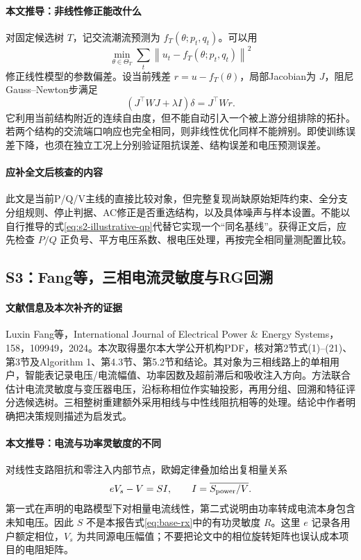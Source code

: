 \documentclass[UTF8,11pt,fontset=fandol]{ctexart}
\newcommand{\norm}[1]{\left\lVert#1\right\rVert}
\theoremstyle{remark}
\numberwithin{equation}{section}
\begin{document}
\paragraph{本文推导：非线性修正能改什么}
对固定候选树 $T$，记交流潮流预测为 $f_T(\theta;p_t,q_t)$。可以用
\begin{equation}
 \min_{\theta\in\Theta_T}\sum_t\norm{u_t-f_T(\theta;p_t,q_t)}^2
\end{equation}
修正线性模型的参数偏差。设当前残差 $r=u-f_T(\theta)$，局部Jacobian为 $J$，阻尼Gauss--Newton步满足
\begin{equation}
 (J^\top WJ+\lambda I)\delta=J^\top Wr.
\end{equation}
它利用当前结构附近的连续自由度，但不能自动引入一个被上游分组排除的拓扑。若两个结构的交流端口响应也完全相同，则非线性优化同样不能辨别。即使训练误差下降，也须在独立工况上分别验证阻抗误差、结构误差和电压预测误差。

\paragraph{应补全文后核查的内容}
此文是当前P/Q/V主线的直接比较对象，但完整复现尚缺原始矩阵约束、全分支分组规则、停止判据、AC修正是否重选结构，以及具体噪声与样本设置。不能以自行推导的式\eqref{eq:s2-illustrative-qp}代替它实现一个“同名基线”。获得正文后，应先检查 $P/Q$ 正负号、平方电压系数、根电压处理，再按完全相同量测配置比较。

\subsection{S3：Fang等，三相电流灵敏度与RG回溯}
\paragraph{文献信息及本次补齐的证据}
Luxin Fang等，International Journal of Electrical Power \& Energy Systems，158，109949，2024\citep{S3}。本次取得墨尔本大学公开机构PDF，核对第2节式(1)--(21)、第3节及Algorithm 1、第4.3节、第5.2节和结论。其对象为三相线路上的单相用户，智能表记录电压/电流幅值、功率因数及超前滞后和吸收注入方向。方法联合估计电流灵敏度与变压器电压，沿标称相位作实轴投影，再用分组、回溯和特征评分选候选树。三相整树重建额外采用相线与中性线阻抗相等的处理。结论中作者明确把决策规则描述为启发式。

\paragraph{本文推导：电流与功率灵敏度的不同}
对线性支路阻抗和零注入内部节点，欧姆定律叠加给出复相量关系
\begin{equation}
 eV_s-V=SI,\qquad I=\overline{S_{\rm power}/V}.
 \label{eq:fang-current}
\end{equation}
第一式在声明的电路模型下对相量电流线性，第二式说明由功率转成电流本身包含未知电压。因此 $S$ 不是本报告式\eqref{eq:base-rx}中的有功灵敏度 $R$。这里 $e$ 记录各用户额定相位，$V_s$ 为共同源电压幅值；不要把论文中的相位旋转矩阵也误认成本项目的电阻矩阵。
\end{document}
